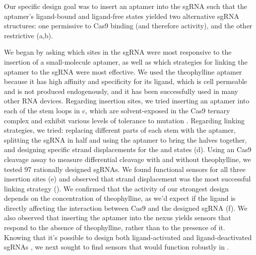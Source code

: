 \documentclass[10pt,oneside]{article}
\begin{document}



Our specific design goal was to insert an aptamer into the sgRNA such that the aptamer's ligand-bound and ligand-free states yielded two alternative sgRNA structures: one permissive to Cas9 binding (and therefore activity), and the other restrictive (a,b). 


We began by asking which sites in the sgRNA were most responsive to the insertion of a small-molecule aptamer, as well as which strategies for linking the aptamer to the sgRNA were most effective.  We used the theophylline aptamer because it has high affinity and specificity for its ligand, which is cell permeable and is not produced endogenously, and it has been successfully used in many other RNA devices.  Regarding insertion sites, we tried inserting an aptamer into each of the stem loops in c, which are solvent-exposed in the Cas9 ternary complex \autocite{nishimasu2014} and exhibit various levels of tolerance to mutation \autocite{briner2014}.  Regarding linking strategies, we tried: replacing different parts of each stem with the aptamer, splitting the sgRNA in half and using the aptamer to bring the halves together, and designing specific strand displacements for the \apo{} and \holo{} states (d).  Using an \invitro{} Cas9 cleavage assay to measure differential cleavage with and without theophylline, we tested 97 rationally designed sgRNAs.  We found functional sensors for all three insertion sites (e) and observed that strand displacement was the most successful linking strategy ().  We confirmed that the activity of our strongest design depends on the concentration of theophylline, as we'd expect if the ligand is directly affecting the interaction between Cas9 and the designed sgRNA (f).  We also observed that inserting the aptamer into the nexus yields sensors that respond to the absence of theophylline, rather than to the presence of it.  Knowing that it's possible to design both ligand-activated and ligand-deactivated sgRNAs \invitro{}, we next sought to find sensors that would function robustly in \ecoli{}.
\end{document}
